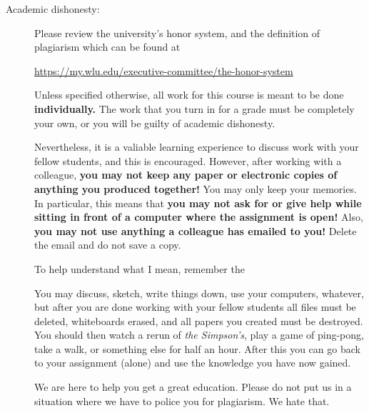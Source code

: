 \documentclass[12pt]{article}
\begin{document}
\begin{description}
     
\item[Academic dishonesty:] Please review the university's
honor system, and the definition of plagiarism
which can be found at

\centerline{
\url{https://my.wlu.edu/executive-committee/the-honor-system}
}

  Unless specified otherwise, all work for this course is meant to
  be done {\bf individually.}  The work that you turn in for a grade
  must be completely your own, or you will be guilty of academic
  dishonesty.

  Nevertheless, it is a valiable learning experience to discuss
  work with your fellow students, and this is encouraged.
  However, after working with a colleague, {\bf you may not keep any
    paper or electronic copies of anything you produced together!}
  You may only keep your memories.  In particular, this means that
  {\bf you may not ask for or give help while sitting in front of a
    computer where the assignment is open!}  Also, {\bf you may not
    use anything a colleague has emailed to you!}  Delete the email
  and do not save a copy.

  To help understand what I mean, remember the \\
  \centerline{}  You may discuss, sketch, write things down, use
  your computers, whatever, but after you are done working with your
  fellow students all files must be deleted, whiteboards erased, and
  all papers you created must be destroyed.  You should then watch a
  rerun of {\em the Simpson's}, play a game of ping-pong, take a walk,
  or something else for half an hour. After this you can go back to
  your assignment (alone) and use the knowledge you have now gained.

  We are here to help you get a great education.  Please do not
  put us in a situation where we have to police you for plagiarism.
  We hate that.


\end{description}
\end{document}
